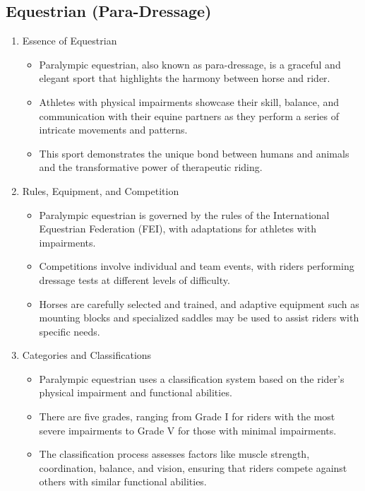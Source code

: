 \subsection{Equestrian (Para-Dressage)}

\begin{enumerate}

\item Essence of Equestrian
    \begin{itemize}
    \item Paralympic equestrian, also known as para-dressage, is a graceful and elegant sport that highlights the harmony between horse and rider. 
    \item Athletes with physical impairments showcase their skill, balance, and communication with their equine partners as they perform a series of intricate movements and patterns. 
    \item This sport demonstrates the unique bond between humans and animals and the transformative power of therapeutic riding.
    \end{itemize}

\item Rules, Equipment, and Competition
    \begin{itemize}
    \item Paralympic equestrian is governed by the rules of the International Equestrian Federation (FEI), with adaptations for athletes with impairments. 
    \item Competitions involve individual and team events, with riders performing dressage tests at different levels of difficulty. 
    \item Horses are carefully selected and trained, and adaptive equipment such as mounting blocks and specialized saddles may be used to assist riders with specific needs.
    \end{itemize}

\item Categories and Classifications
    \begin{itemize}
    \item Paralympic equestrian uses a classification system based on the rider's physical impairment and functional abilities. 
    \item There are five grades, ranging from Grade I for riders with the most severe impairments to Grade V for those with minimal impairments. 
    \item The classification process assesses factors like muscle strength, coordination, balance, and vision, ensuring that riders compete against others with similar functional abilities.
    \end{itemize}

\end{enumerate}